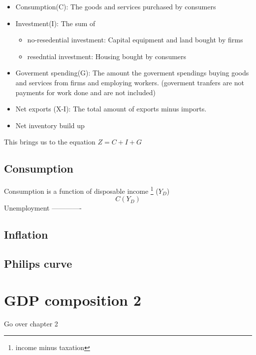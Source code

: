 \documentclass[twocolumn]{article}
\providecommand{\tightlist}{%
  \setlength{\itemsep}{0pt}\setlength{\parskip}{0pt}}
\begin{document}
\begin{itemize}
\tightlist
\item
  Consumption(C): The goods and services purchased by consumers
\item
  Investment(I): The sum of

  \begin{itemize}
  \tightlist
  \item
    no-resedential investment: Capital equipment and land bought by
    firms
  \item
    resedntial investment: Housing bought by consumers
  \end{itemize}
\item
  Goverment spending(G): The amount the goverment spendings buying goods
  and services from firms and employing workers. (goverment tranfers are
  not payments for work done and are not included)
\item
  Net exports (X-I): The total amount of exports minus imports.
\item
  Net inventory build up
\end{itemize}

This brings us to the equation \(Z = C + I + G\)

\hypertarget{consumption}{%
\subsection{Consumption}\label{consumption}}

Consumption is a function of disposable income \footnote{income minus
  taxation} (\(Y_D\)) \[ C(Y_D) \] Unemployment -------------

\hypertarget{inflation}{%
\subsection{Inflation}\label{inflation}}

\hypertarget{philips-curve}{%
\subsection{Philips curve}\label{philips-curve}}

\hypertarget{gdp-composition-2}{%
\section{GDP composition 2}\label{gdp-composition-2}}

Go over chapter 2
\end{document}
